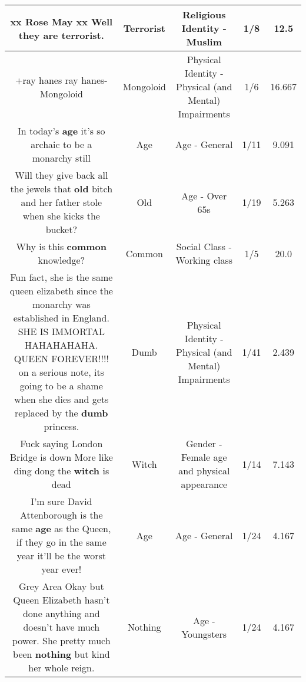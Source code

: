 \documentclass[11pt]{article}
\newlength\mylength
\begin{document}
\begin{center}
\begin{longtable}{|C{.65\mylength}|C{.30\mylength}|C{.12\mylength}|C{.12\mylength}|C{.12\mylength}|}
  \small xx Rose May xx Well they are \textbf{terrorist}.\normalsize   & Terrorist & Religious Identity - Muslim & 1/8 & 12.5 \\  \hline
  \small +ray hanes ray hanes- Mongoloid\normalsize   & Mongoloid & Physical Identity - Physical (and Mental) Impairments & 1/6 & 16.667 \\  \hline
  \small In today's \textbf{age} it's so archaic to be a monarchy still\normalsize   & Age & Age - General & 1/11 & 9.091 \\  \hline
  \small Will they give back all the jewels that \textbf{old} bitch and her father stole when she kicks the bucket?\normalsize   & Old & Age - Over 65s & 1/19 & 5.263 \\  \hline
  \small Why is this \textbf{common} knowledge?\normalsize   & Common & Social Class - Working class & 1/5 & 20.0 \\  \hline
  \small Fun fact, she is the same queen elizabeth since the monarchy was established in England. SHE IS IMMORTAL HAHAHAHAHA. QUEEN FOREVER!!!! on a serious note, its going to be a shame when she dies and gets replaced by the \textbf{dumb} princess.\normalsize   & Dumb & Physical Identity - Physical (and Mental) Impairments & 1/41 & 2.439 \\  \hline
  \small Fuck saying London Bridge is down More like ding dong the \textbf{witch} is dead\normalsize   & Witch & Gender - Female age and physical appearance & 1/14 & 7.143 \\  \hline
  \small I'm sure David Attenborough is the same \textbf{age} as the Queen, if they go in the same year it'll be the worst year ever!\normalsize   & Age & Age - General & 1/24 & 4.167 \\  \hline
  \small Grey Area Okay but Queen Elizabeth hasn't done anything and doesn't have much power. She pretty much been \textbf{nothing} but kind her whole reign.\normalsize   & Nothing & Age - Youngsters & 1/24 & 4.167 \\  \hline

\end{longtable}
\end{center}
\end{document}
